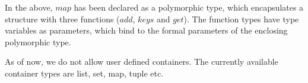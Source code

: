 \documentclass[12pt,a4paper]{report}
\begin{document}
In the above, $map$ has been declared as a polymorphic type, which encapsulates a structure with three functions ($add$, $keys$ and $get$). The function types have type variables as parameters, which bind to the formal parameters of the enclosing polymorphic type.

As of now, we do not allow user defined containers. The currently available container types are list, set, map, tuple etc. 
\end{document}
